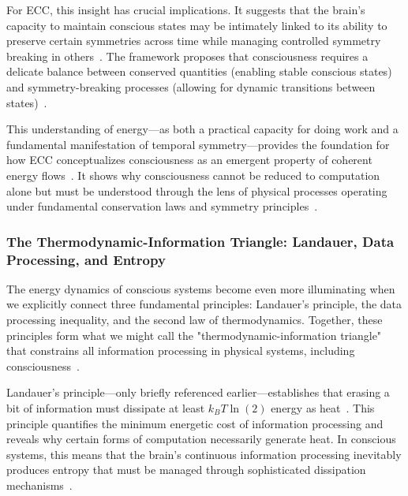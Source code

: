 For ECC, this insight has crucial implications. It suggests that the brain's capacity to maintain conscious states may be intimately linked to its ability to preserve certain symmetries across time while managing controlled symmetry breaking in others~\cite{van2025processes}. The framework proposes that consciousness requires a delicate balance between conserved quantities (enabling stable conscious states) and symmetry-breaking processes (allowing for dynamic transitions between states)~\cite{bosl2025dynamical}.

This understanding of energy—as both a practical capacity for doing work and a fundamental manifestation of temporal symmetry—provides the foundation for how ECC conceptualizes consciousness as an emergent property of coherent energy flows~\cite{freeman2007}. It shows why consciousness cannot be reduced to computation alone but must be understood through the lens of physical processes operating under fundamental conservation laws and symmetry principles~\cite{pinotsis2023cytoelectric}.

\subsubsection{The Thermodynamic-Information Triangle: Landauer, Data Processing, and Entropy~}

The energy dynamics of conscious systems become even more illuminating when we explicitly connect three fundamental principles: Landauer's principle, the data processing inequality, and the second law of thermodynamics. Together, these principles form what we might call the "thermodynamic-information triangle" that constrains all information processing in physical systems, including consciousness~\cite{parrondo2015}.

Landauer's principle—only briefly referenced earlier—establishes that erasing a bit of information must dissipate at least $k_B T \ln(2)$ energy as heat~\cite{landauer1996}. This principle quantifies the minimum energetic cost of information processing and reveals why certain forms of computation necessarily generate heat. In conscious systems, this means that the brain's continuous information processing inevitably produces entropy that must be managed through sophisticated dissipation mechanisms~.

